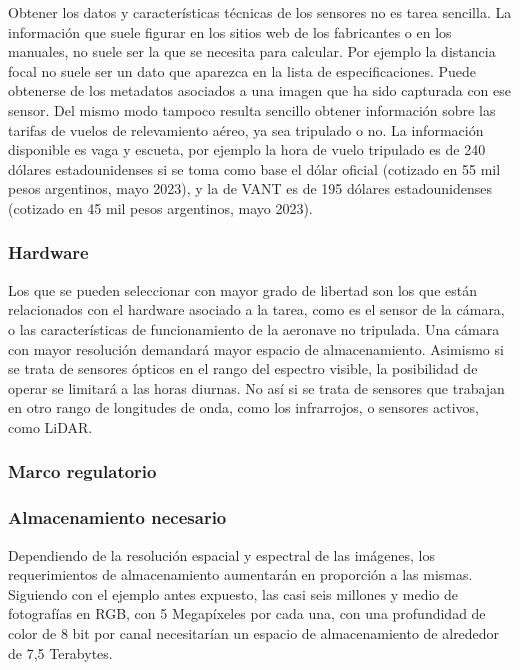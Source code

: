 Obtener los datos y características técnicas de los sensores no es tarea sencilla. La información que suele figurar en los sitios web de los fabricantes o en los manuales, no suele ser la que se necesita para calcular. Por ejemplo la distancia focal no suele ser un dato que aparezca en la lista de especificaciones. Puede obtenerse de los metadatos asociados a una imagen que ha sido capturada con ese sensor.
Del mismo modo tampoco resulta sencillo obtener información sobre las tarifas de vuelos de relevamiento aéreo, ya sea tripulado o no. La información disponible es vaga y escueta, por ejemplo la hora de vuelo tripulado es de 240 dólares estadounidenses si se toma como base el dólar oficial (cotizado en 55 mil pesos argentinos, mayo 2023), y la de VANT es de 195 dólares estadounidenses (cotizado en 45 mil pesos argentinos, mayo 2023).
\subsubsection{Hardware}
Los que se pueden seleccionar con mayor grado de libertad son los que están relacionados con el hardware asociado a la tarea, como es el sensor de la cámara, o las características de funcionamiento de la aeronave no tripulada. Una cámara con mayor resolución demandará mayor espacio de almacenamiento. Asimismo si se trata de sensores ópticos en el rango del espectro visible, la posibilidad de operar se limitará a las horas diurnas. No así si se trata de sensores que trabajan en otro rango de longitudes de onda, como los infrarrojos, o sensores activos, como LiDAR.
\subsubsection{Marco regulatorio}

\subsubsection{Almacenamiento necesario}
Dependiendo de la resolución espacial y espectral de las imágenes, los requerimientos de almacenamiento aumentarán en proporción a las mismas. Siguiendo con el ejemplo antes expuesto, las casi seis millones y medio de fotografías en RGB, con 5 Megapíxeles por cada una, con una profundidad de color de 8 bit por canal necesitarían un espacio de almacenamiento de alrededor de 7,5 Terabytes.
